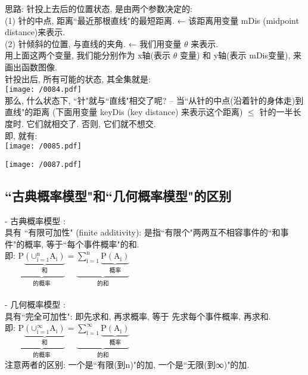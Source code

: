 \documentclass[UTF8]{ctexart}
\begin{document}
	思路: 针投上去后的位置状态, 是由两个参数决定的: \\
(1) 针的中点, 距离``最近那根直线"的最短距离. ← 该距离用变量 mDis (midpoint distance)来表示. \\
(2) 针倾斜的位置, 与直线的夹角. ← 我们用变量 $\theta$ 来表示.  \\
用上面这两个变量, 我们能分别作为 x轴(表示 $\theta$ 变量) 和 y轴(表示 mDis变量), 来画出函数图像. \\
		
	针投出后, 所有可能的状态, 其全集就是: \\
\texttt{[image: /0084.pdf]} \\
			
	那么, 什么状态下, ``针"就与``直线"相交了呢? -- 当``从针的中点(沿着针的身体走)到直线"的距离 (下面用变量 keyDis (key distance) 来表示这个距离) $\leq$ 针的一半长度时. 它们就相交了. 否则, 它们就不想交. \\
	即, 就有: \\	
\texttt{[image: /0085.pdf]}

\texttt{[image: /0087.pdf]}




\subsection{``古典概率模型"和``几何概率模型"的区别}

- 古典概率模型 : \\
具有 ``有限可加性" (finite additivity): 是指``有限个"两两互不相容事件的``和事件"的概率, 等于``每个事件概率"的和. \\
即: $
\underset{\text{的概率}}{\underbrace{\text{P}\underset{\text{和}}{\underbrace{\left( \text{∪}_{\text{i}=1}^{\text{n}}\text{A}_{\text{i}} \right) }}}}=\underset{\text{的和}}{\underbrace{\sum_{\text{i}=1}^{\text{n}}{\underset{\text{概率}}{\underbrace{\text{P}\left( \text{A}_{\text{i}} \right) }}}}}
$ \\
\\

- 几何概率模型 : \\
具有``完全可加性":  即先求和, 再求概率, 等于 先求每个事件概率, 再求和. \\
即: $
\underset{\text{的概率}}{\underbrace{\text{P}\underset{\text{和}}{\underbrace{\left( \text{∪}_{\text{i}=1}^{\infty}\text{A}_{\text{i}} \right) }}}}=\underset{\text{的和}}{\underbrace{\sum_{\text{i}=1}^{\infty}{\underset{\text{概率}}{\underbrace{\text{P}\left( \text{A}_{\text{i}} \right) }}}}}
$ \\

注意两者的区别: 一个是``有限(到n)"的加,  一个是``无限(到∞)"的加.


	
\end{document}
